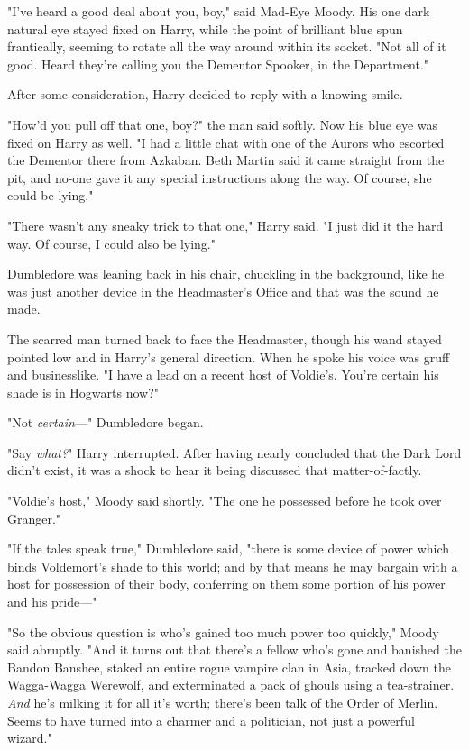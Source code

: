 "I've heard a good deal about you, boy," said Mad-Eye Moody. His one dark natural eye stayed fixed on Harry, while the point of brilliant blue spun frantically, seeming to rotate all the way around within its socket. "Not all of it good. Heard they're calling you the Dementor Spooker, in the Department."

After some consideration, Harry decided to reply with a knowing smile.

"How'd you pull off that one, boy?" the man said softly. Now his blue eye was fixed on Harry as well. "I had a little chat with one of the Aurors who escorted the Dementor there from Azkaban. Beth Martin said it came straight from the pit, and no-one gave it any special instructions along the way. Of course, she could be lying."

"There wasn't any sneaky trick to that one," Harry said. "I just did it the hard way. Of course, I could also be lying."

Dumbledore was leaning back in his chair, chuckling in the background, like he was just another device in the Headmaster's Office and that was the sound he made.

The scarred man turned back to face the Headmaster, though his wand stayed pointed low and in Harry's general direction. When he spoke his voice was gruff and businesslike. "I have a lead on a recent host of Voldie's. You're certain his shade is in Hogwarts now?"

"Not \emph{certain}---" Dumbledore began.

"Say \emph{what?}" Harry interrupted. After having nearly concluded that the Dark Lord didn't exist, it was a shock to hear it being discussed that matter-of-factly.

"Voldie's host," Moody said shortly. "The one he possessed before he took over Granger."

"If the tales speak true," Dumbledore said, "there is some device of power which binds Voldemort's shade to this world; and by that means he may bargain with a host for possession of their body, conferring on them some portion of his power and his pride---"

"So the obvious question is who's gained too much power too quickly," Moody said abruptly. "And it turns out that there's a fellow who's gone and banished the Bandon Banshee, staked an entire rogue vampire clan in Asia, tracked down the Wagga-Wagga Werewolf, and exterminated a pack of ghouls using a tea-strainer. \emph{And} he's milking it for all it's worth; there's been talk of the Order of Merlin. Seems to have turned into a charmer and a politician, not just a powerful wizard."

